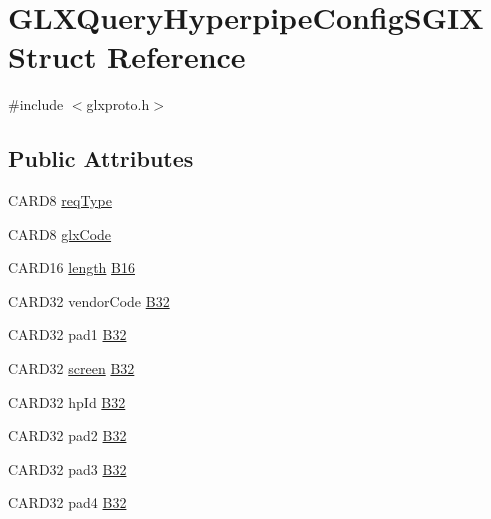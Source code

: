 \hypertarget{struct_g_l_x_query_hyperpipe_config_s_g_i_x}{}\section{G\+L\+X\+Query\+Hyperpipe\+Config\+S\+G\+IX Struct Reference}
\label{struct_g_l_x_query_hyperpipe_config_s_g_i_x}


{\ttfamily \#include $<$glxproto.\+h$>$}

\subsection*{Public Attributes}
\begin{DoxyCompactItemize}
\item 
C\+A\+R\+D8 \hyperlink{struct_g_l_x_query_hyperpipe_config_s_g_i_x_aa9f3ad2e52e38345ec4231a6ffb5cd67}{req\+Type}
\item 
C\+A\+R\+D8 \hyperlink{struct_g_l_x_query_hyperpipe_config_s_g_i_x_a723bde61da7f9072d2fc55b41e727503}{glx\+Code}
\item 
C\+A\+R\+D16 \hyperlink{glcorearb_8h_ab9c919755bde3b34349e23a32b4e0fa7}{length} \hyperlink{struct_g_l_x_query_hyperpipe_config_s_g_i_x_ac5180fc93bea6a92ccb56631f42b1282}{B16}
\item 
C\+A\+R\+D32 vendor\+Code \hyperlink{struct_g_l_x_query_hyperpipe_config_s_g_i_x_ad0e0660434782756cbc8e6d12d3260e7}{B32}
\item 
C\+A\+R\+D32 pad1 \hyperlink{struct_g_l_x_query_hyperpipe_config_s_g_i_x_abdfb90e9f967758942c4ca60469057e6}{B32}
\item 
C\+A\+R\+D32 \hyperlink{cad_8h_ae04e09e4e3831bfc1632c509ae37dcec}{screen} \hyperlink{struct_g_l_x_query_hyperpipe_config_s_g_i_x_ae284f07874c97a61a5a35c09209a195f}{B32}
\item 
C\+A\+R\+D32 hp\+Id \hyperlink{struct_g_l_x_query_hyperpipe_config_s_g_i_x_acc2bd25277dfc8b9a175ecfbb32006cf}{B32}
\item 
C\+A\+R\+D32 pad2 \hyperlink{struct_g_l_x_query_hyperpipe_config_s_g_i_x_a5993c77a7dd0efac6fa574cb816edeaa}{B32}
\item 
C\+A\+R\+D32 pad3 \hyperlink{struct_g_l_x_query_hyperpipe_config_s_g_i_x_a7171fc6c1db90400fb9296f80d539fdd}{B32}
\item 
C\+A\+R\+D32 pad4 \hyperlink{struct_g_l_x_query_hyperpipe_config_s_g_i_x_a420f42404a202b7b75d7339b459d7d4f}{B32}
\end{DoxyCompactItemize}


